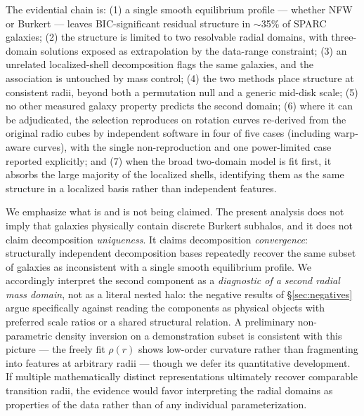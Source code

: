\documentclass[twocolumn]{aastex701}
\begin{document}
The evidential chain is: (1) a single smooth equilibrium profile ---
whether NFW or Burkert --- leaves BIC-significant residual structure in
$\sim$35\% of SPARC galaxies; (2) the structure is limited to two resolvable
radial domains, with three-domain solutions exposed as extrapolation by the
data-range constraint; (3) an unrelated localized-shell decomposition flags
the same galaxies, and the association is untouched by mass control; (4) the
two methods place structure at consistent radii, beyond both a permutation
null and a generic mid-disk scale; (5) no other measured galaxy property
predicts the second domain; (6) where it can be adjudicated, the selection
reproduces on rotation curves re-derived from the original radio cubes by
independent software in four of five cases (including warp-aware curves), with
the single non-reproduction and one power-limited case reported explicitly;
and (7) when the broad two-domain model is fit first, it absorbs the large
majority of the localized shells, identifying them as the same structure in a
localized basis rather than independent features.

We emphasize what is and is not being claimed. The present analysis does not
imply that galaxies physically contain discrete Burkert subhalos, and it does
not claim decomposition \emph{uniqueness}. It claims decomposition
\emph{convergence}: structurally independent decomposition bases repeatedly
recover the same subset of galaxies as inconsistent with a single smooth
equilibrium profile. We accordingly interpret the second component as
a \emph{diagnostic of a second radial mass domain}, not as a literal nested
halo: the negative results of \S\ref{sec:negatives} argue specifically
against reading the components as physical objects with preferred scale
ratios or a shared structural relation. A preliminary non-parametric density
inversion on a demonstration subset is consistent with this picture --- the
freely fit $\rho(r)$ shows low-order curvature rather than fragmenting into
features at arbitrary radii --- though we defer its quantitative development.
If multiple mathematically distinct representations ultimately recover
comparable transition radii, the evidence would favor interpreting the radial
domains as properties of the data rather than of any individual
parameterization.
\end{document}
